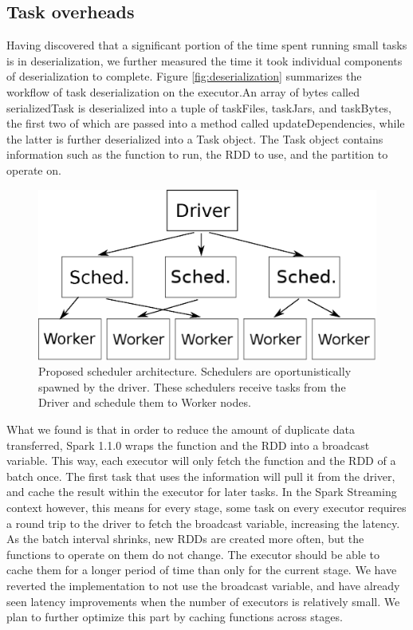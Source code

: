 \subsection{Task overheads}
Having discovered that a significant portion of the time spent running small tasks is in deserialization, we further measured the time it took individual components of deserialization to complete. Figure \ref{fig:deserialization} summarizes the workflow of task deserialization on the executor.An array of bytes called serializedTask is deserialized into a tuple of taskFiles, taskJars, and taskBytes, the first two of which are passed into a method called updateDependencies, while the latter is further deserialized into a Task object. The Task object contains information such as the function to run, the RDD to use, and the partition to operate on.


\begin{figure}[t!]
  \begin{center}
    \includegraphics[scale=0.45]{scheduler_architecture.eps}
  \end{center}
  \caption{Proposed scheduler architecture. Schedulers are oportunistically spawned by the driver. These schedulers receive tasks from the Driver and schedule them to Worker nodes.}
  \label{fig:schedarch}
\end{figure}

What we found is that in order to reduce the amount of duplicate data transferred, Spark 1.1.0 wraps the function and the RDD into a broadcast variable. This way, each executor will only fetch the function and the RDD of a batch once. The first task that uses the information will pull it from the driver, and cache the result within the executor for later tasks. In the Spark Streaming context however, this means for every stage, some task on every executor requires a round trip to the driver to fetch the broadcast variable, increasing the latency. As the batch interval shrinks, new RDDs are created more often, but the functions to operate on them do not change. The executor should be able to cache them for a longer period of time than only for the current stage. We have reverted the implementation to not use the broadcast variable, and have already seen latency improvements when the number of executors is relatively small. We plan to further optimize this part by caching functions across stages.

